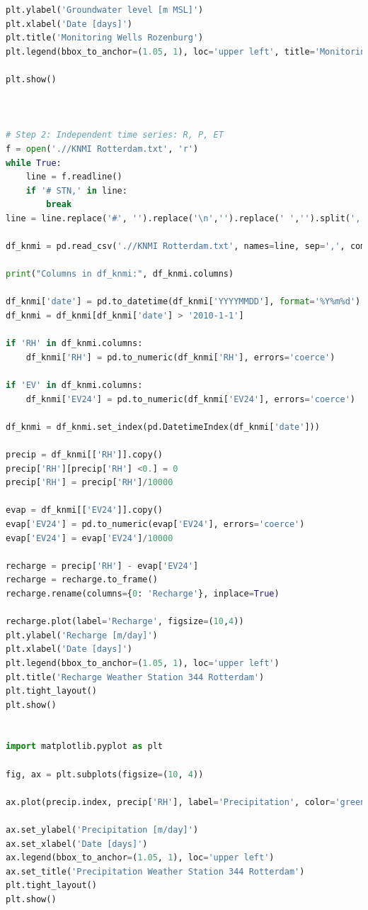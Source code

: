 \begin{lstlisting}[language=Python]
plt.ylabel('Groundwater level [m MSL]')
plt.xlabel('Date [days]')
plt.title('Monitoring Wells Rozenburg')
plt.legend(bbox_to_anchor=(1.05, 1), loc='upper left', title='Monitoring Well')

plt.show()



# Step 2: Independent time series: R, P, ET
f = open('.//KNMI Rotterdam.txt', 'r')
while True: 
    line = f.readline()
    if '# STN,' in line: 
        break 
line = line.replace('#', '').replace('\n','').replace(' ','').split(',')

df_knmi = pd.read_csv('.//KNMI Rotterdam.txt', names=line, sep=',', comment='#')

print("Columns in df_knmi:", df_knmi.columns)

df_knmi['date'] = pd.to_datetime(df_knmi['YYYYMMDD'], format='%Y%m%d')
df_knmi = df_knmi[df_knmi['date'] > '2010-1-1']

if 'RH' in df_knmi.columns:
    df_knmi['RH'] = pd.to_numeric(df_knmi['RH'], errors='coerce')

if 'EV' in df_knmi.columns:
    df_knmi['EV24'] = pd.to_numeric(df_knmi['EV24'], errors='coerce')

df_knmi = df_knmi.set_index(pd.DatetimeIndex(df_knmi['date']))

precip = df_knmi[['RH']].copy()
precip['RH'][precip['RH'] <0.] = 0 
precip['RH'] = precip['RH']/10000 

evap = df_knmi[['EV24']].copy()
evap['EV24'] = pd.to_numeric(evap['EV24'], errors='coerce')
evap['EV24'] = evap['EV24']/10000

recharge = precip['RH'] - evap['EV24']
recharge = recharge.to_frame()
recharge.rename(columns={0: 'Recharge'}, inplace=True)

recharge.plot(label='Recharge', figsize=(10,4))
plt.ylabel('Recharge [m/day]')
plt.xlabel('Date [days]')
plt.legend(bbox_to_anchor=(1.05, 1), loc='upper left')
plt.title('Recharge Weather Station 344 Rotterdam')
plt.tight_layout()
plt.show()


import matplotlib.pyplot as plt

fig, ax = plt.subplots(figsize=(10, 4))

ax.plot(precip.index, precip['RH'], label='Precipitation', color='green')

ax.set_ylabel('Precipitation [m/day]')
ax.set_xlabel('Date [days]')
ax.legend(bbox_to_anchor=(1.05, 1), loc='upper left')
ax.set_title('Precipitation Weather Station 344 Rotterdam')
plt.tight_layout()
plt.show()


\end{lstlisting}
